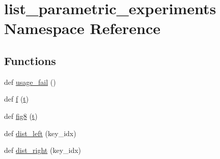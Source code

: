 \hypertarget{namespacelist__parametric__experiments}{}\section{list\+\_\+parametric\+\_\+experiments Namespace Reference}
\label{namespacelist__parametric__experiments}
\subsection*{Functions}
\begin{DoxyCompactItemize}
\item 
def \hyperlink{namespacelist__parametric__experiments_aac459e1558127427fa42d8c59d987cea}{usage\+\_\+fail} ()
\item 
def \hyperlink{namespacelist__parametric__experiments_a6c397223fabb6e6525433a139daf5f37}{f} (\hyperlink{namespacelist__parametric__experiments_ada91731ac23c09ea7b358830508de2d2}{t})
\item 
def \hyperlink{namespacelist__parametric__experiments_adf4a7e93cc3b8fce8818092932ce7b0f}{fig8} (\hyperlink{namespacelist__parametric__experiments_ada91731ac23c09ea7b358830508de2d2}{t})
\item 
def \hyperlink{namespacelist__parametric__experiments_a5a1a9e361d03b894f50d8c84766ed3e3}{dist\+\_\+left} (key\+\_\+idx)
\item 
def \hyperlink{namespacelist__parametric__experiments_a42e39f08f5220ffd7bfd135815bbcf97}{dist\+\_\+right} (key\+\_\+idx)
\end{DoxyCompactItemize}
